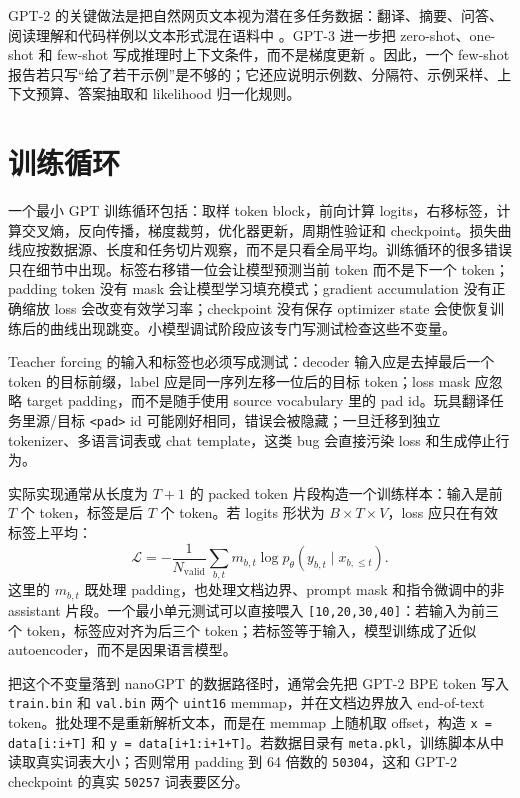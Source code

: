 \documentclass[UTF8,zihao=-4,openany]{ctexbook}
\begin{document}
GPT-2 的关键做法是把自然网页文本视为潜在多任务数据：翻译、摘要、问答、阅读理解和代码样例以文本形式混在语料中 \cite{radford2019language}。GPT-3 进一步把 zero-shot、one-shot 和 few-shot 写成推理时上下文条件，而不是梯度更新 \cite{brown2020language}。因此，一个 few-shot 报告若只写“给了若干示例”是不够的；它还应说明示例数、分隔符、示例采样、上下文预算、答案抽取和 likelihood 归一化规则。

\section{训练循环}
一个最小 GPT 训练循环包括：取样 token block，前向计算 logits，右移标签，计算交叉熵，反向传播，梯度裁剪，优化器更新，周期性验证和 checkpoint。损失曲线应按数据源、长度和任务切片观察，而不是只看全局平均。训练循环的很多错误只在细节中出现。标签右移错一位会让模型预测当前 token 而不是下一个 token；padding token 没有 mask 会让模型学习填充模式；gradient accumulation 没有正确缩放 loss 会改变有效学习率；checkpoint 没有保存 optimizer state 会使恢复训练后的曲线出现跳变。小模型调试阶段应该专门写测试检查这些不变量。

Teacher forcing 的输入和标签也必须写成测试：decoder 输入应是去掉最后一个 token 的目标前缀，label 应是同一序列左移一位后的目标 token；loss mask 应忽略 target padding，而不是随手使用 source vocabulary 里的 pad id。玩具翻译任务里源/目标 \texttt{<pad>} id 可能刚好相同，错误会被隐藏；一旦迁移到独立 tokenizer、多语言词表或 chat template，这类 bug 会直接污染 loss 和生成停止行为。

实际实现通常从长度为 $T+1$ 的 packed token 片段构造一个训练样本：输入是前 $T$ 个 token，标签是后 $T$ 个 token。若 logits 形状为 $B\times T\times V$，loss 应只在有效标签上平均：
\[
  \mathcal{L}=-\frac{1}{N_{\mathrm{valid}}}
  \sum_{b,t}m_{b,t}\log p_{\theta}(y_{b,t}\mid x_{b,\le t}) .
\]
这里的 $m_{b,t}$ 既处理 padding，也处理文档边界、prompt mask 和指令微调中的非 assistant 片段。一个最小单元测试可以直接喂入 \texttt{[10,20,30,40]}：若输入为前三个 token，标签应对齐为后三个 token；若标签等于输入，模型训练成了近似 autoencoder，而不是因果语言模型。

把这个不变量落到 nanoGPT 的数据路径时，通常会先把 GPT-2 BPE token 写入 \texttt{train.bin} 和 \texttt{val.bin} 两个 \texttt{uint16} memmap，并在文档边界放入 end-of-text token。批处理不是重新解析文本，而是在 memmap 上随机取 offset，构造 \texttt{x = data[i:i+T]} 和 \texttt{y = data[i+1:i+1+T]}。若数据目录有 \texttt{meta.pkl}，训练脚本从中读取真实词表大小；否则常用 padding 到 64 倍数的 \texttt{50304}，这和 GPT-2 checkpoint 的真实 \texttt{50257} 词表要区分。
\end{document}
